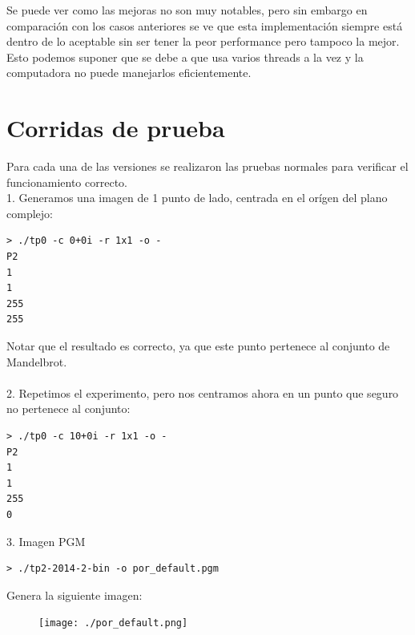 \documentclass[a4paper,10pt]{article}
\begin{document}
Se puede ver como las mejoras no son muy notables, pero sin embargo en comparación con los casos anteriores se ve que esta implementación siempre está dentro de lo aceptable sin ser tener la peor performance pero tampoco la mejor. Esto podemos suponer que se debe a que usa varios threads a la vez y la computadora no puede manejarlos eficientemente.









\section{Corridas de prueba}

Para cada una de las versiones se realizaron las pruebas normales para verificar el funcionamiento correcto.\\

1. Generamos una imagen de 1 punto de lado, centrada en el or\'igen del plano complejo:
\begin{verbatim}
> ./tp0 -c 0+0i -r 1x1 -o -
P2
1
1
255
255
\end{verbatim}

Notar que el resultado es correcto, ya que este punto pertenece al conjunto de Mandelbrot.\\
\\
2. Repetimos el experimento, pero nos centramos ahora en un punto que seguro no pertenece
al conjunto:
\begin{verbatim}
> ./tp0 -c 10+0i -r 1x1 -o -
P2
1
1
255
0
\end{verbatim}

3. Imagen PGM
\begin{verbatim}
> ./tp2-2014-2-bin -o por_default.pgm
\end{verbatim}
Genera la siguiente imagen:
\begin{figure}
\begin{center}
\texttt{[image: ./por\_default.png]}
\label{fig:Region barrida por defecto}
\caption{}
\end{center}
\end{figure}
\end{document}
